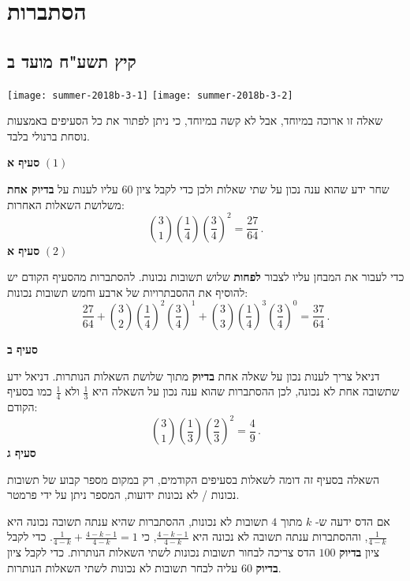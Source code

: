 

\chapter{הסתברות}


\section{קיץ תשע"ח מועד ב}

\begin{center}
\hspace*{8em}\texttt{[image: summer-2018b-3-1]}
\hspace*{-2.2em}\texttt{[image: summer-2018b-3-2]}
\end{center}

שאלה זו ארוכה במיוחד, אבל לא קשה במיוחד, כי ניתן לפתור את כל הסעיפים באמצעות נוסחת ברנולי בלבד.

\textbf{סעיף א}
$(1)$

שחר ידע שהוא ענה נכון על שתי שאלות ולכן כדי לקבל ציון
$60$
עליו לענות על 
\textbf{בדיוק אחת}
משלושת השאלות האחרות:
\[
{3 \choose 1}\left(\frac{1}{4}\right)\left(\frac{3}{4}\right)^2=\frac{27}{64}\,.
\]
\textbf{סעיף א}
$(2)$

כדי לעבור את המבחן עליו לצבור
\textbf{לפחות}
שלוש תשובות נכונות. להסתברות מהסעיף הקודם יש להוסיף את ההסבתרויות של ארבע וחמש תשובות נכונות:
\[
\frac{27}{64}+{3 \choose 2}\left(\frac{1}{4}\right)^2\left(\frac{3}{4}\right)^1+{3 \choose 3}\left(\frac{1}{4}\right)^3\left(\frac{3}{4}\right)^0=\frac{37}{64}\,.
\]

\np

\textbf{סעיף ב}

דניאל צריך לענות נכון על שאלה אחת 
\textbf{בדיוק}
מתוך שלושת השאלות הנותרות. דניאל ידע שתשובה אחת לא נכונה, לכן ההסתברות שהוא ענה נכון על השאלה היא
$\displaystyle\frac{1}{3}$
ולא 
$\displaystyle\frac{1}{4}$
כמו בסעיף הקודם:
\[
{3 \choose 1}\left(\frac{1}{3}\right)\left(\frac{2}{3}\right)^2=\frac{4}{9}\,.
\]
\textbf{סעיף ג}

השאלה בסעיף זה דומה לשאלות בסעיפים הקודמים, רק במקום מספר קבוע של תשובות נכונות / לא נכונות ידועות, המספר ניתן על ידי פרמטר.

אם הדס ידעה ש-%
$k$
מתוך 
$4$
תשובות לא נכונות, ההסתברות שהיא ענתה תשובה נכונה היא
$\displaystyle\frac{1}{4-k}$,
וההסתברות ענתה תשובה לא נכונה היא
$\displaystyle\frac{4-k-1}{4-k}$,
כי 
$\displaystyle\frac{1}{4-k}+\frac{4-k-1}{4-k}=1$.
כדי לקבל ציון 
\textbf{בדיוק}
$100$
הדס צריכה לבחור תשובות נכונות לשתי השאלות הנותרות. כדי לקבל ציון 
\textbf{בדיוק}
$60$
עליה לבחר תשובות לא נכונות לשתי השאלות הנותרות.

